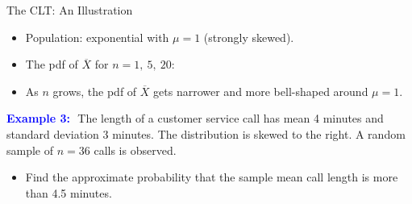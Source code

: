 \documentclass[12pt]{beamer}
\newcommand{\fitO}{}
\newcommand{\exlists}{\setlength{\itemsep}{0pt}}
\newcommand{\Xbar}{\overline{X}}
\begin{document}
\begin{frame}[t]{The CLT: An Illustration}
\begin{itemize}
\item Population: exponential with $\mu=1$ (strongly skewed).
\item The pdf of $\Xbar$ for $n=1,\ 5,\ 20$:
\end{itemize}
\vspace{-0.2cm}
\begin{center}
\end{center}
\vspace{-0.2cm}
\begin{itemize}
\item As $n$ grows, the pdf of $\Xbar$ gets narrower and more bell-shaped around $\mu=1$.
\end{itemize}
\end{frame}

\begin{frame}[t]{}\fitO\exlists
\textcolor{blue}{\textbf{Example 3:}}\,\ The length of a customer service call has
mean 4 minutes and standard deviation 3 minutes. The distribution is skewed to the right.
A random sample of $n=36$ calls is observed.
\begin{itemize}
\item[a)] Find the approximate probability that the sample mean call length is more than 4.5 minutes.\\[0.2cm]
\end{itemize}
\end{frame}
\end{document}
